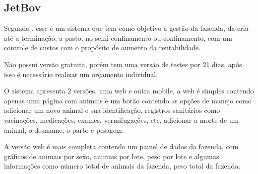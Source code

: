 \documentclass[12pt]{article}
\begin{document}
\begin{titlepage}
\begin{figure}[!h]
\begin{center}
\end{center}
\end{figure}






\newpage


\subsection{JetBov}

Segundo , esse é um sistema que tem como objetivo a gestão da fazenda, da cria até a terminação, a pasto, no semi-confinamento ou confinamento, com um controle de custos com o propósito de aumento da rentabilidade. 

Não possui versão gratuita, porém tem uma versão de testes por 21 dias, após isso é necessário realizar um orçamento individual.

O sistema apresenta 2 versões, uma web e outra mobile, a web é simples contendo apenas uma página com animais e um botão contendo as opções de manejo como adicionar um novo animal e sua identificação, registros sanitários como vacinações, medicações, exames, vermifugações, etc, adicionar a morte de um animal, o desmame, o parto e pesagem.

A versão web é mais completa contendo um painel de dados da fazenda, com gráficos de animais por sexo, animais por lote, peso por lote e algumas informações como número total de animais da fazenda, peso total da fazenda. 


\end{titlepage}
\end{document}
